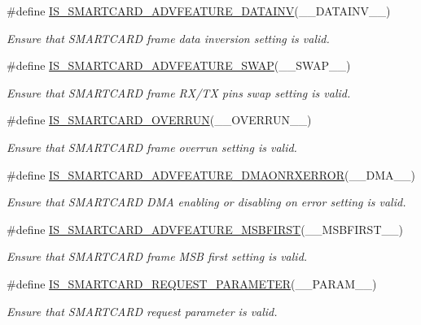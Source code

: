 \begin{DoxyCompactItemize}
\#define \hyperlink{group___s_m_a_r_t_c_a_r_d___private___macros_gaeb50799eed0020c43efd54da9ee6b5f2}{I\+S\+\_\+\+S\+M\+A\+R\+T\+C\+A\+R\+D\+\_\+\+A\+D\+V\+F\+E\+A\+T\+U\+R\+E\+\_\+\+D\+A\+T\+A\+I\+NV}(\+\_\+\+\_\+\+D\+A\+T\+A\+I\+N\+V\+\_\+\+\_\+)
\begin{DoxyCompactList}\small\item\em Ensure that S\+M\+A\+R\+T\+C\+A\+RD frame data inversion setting is valid. \end{DoxyCompactList}\item 
\#define \hyperlink{group___s_m_a_r_t_c_a_r_d___private___macros_gaafa60ea938020acb9b18923735759198}{I\+S\+\_\+\+S\+M\+A\+R\+T\+C\+A\+R\+D\+\_\+\+A\+D\+V\+F\+E\+A\+T\+U\+R\+E\+\_\+\+S\+W\+AP}(\+\_\+\+\_\+\+S\+W\+A\+P\+\_\+\+\_\+)
\begin{DoxyCompactList}\small\item\em Ensure that S\+M\+A\+R\+T\+C\+A\+RD frame R\+X/\+TX pins swap setting is valid. \end{DoxyCompactList}\item 
\#define \hyperlink{group___s_m_a_r_t_c_a_r_d___private___macros_ga62c2384d53181d9049ee70903a5bd597}{I\+S\+\_\+\+S\+M\+A\+R\+T\+C\+A\+R\+D\+\_\+\+O\+V\+E\+R\+R\+UN}(\+\_\+\+\_\+\+O\+V\+E\+R\+R\+U\+N\+\_\+\+\_\+)
\begin{DoxyCompactList}\small\item\em Ensure that S\+M\+A\+R\+T\+C\+A\+RD frame overrun setting is valid. \end{DoxyCompactList}\item 
\#define \hyperlink{group___s_m_a_r_t_c_a_r_d___private___macros_ga68caa23cdb6592178ed44b60ca5e6493}{I\+S\+\_\+\+S\+M\+A\+R\+T\+C\+A\+R\+D\+\_\+\+A\+D\+V\+F\+E\+A\+T\+U\+R\+E\+\_\+\+D\+M\+A\+O\+N\+R\+X\+E\+R\+R\+OR}(\+\_\+\+\_\+\+D\+M\+A\+\_\+\+\_\+)
\begin{DoxyCompactList}\small\item\em Ensure that S\+M\+A\+R\+T\+C\+A\+RD D\+MA enabling or disabling on error setting is valid. \end{DoxyCompactList}\item 
\#define \hyperlink{group___s_m_a_r_t_c_a_r_d___private___macros_ga96b4e4e1136da35dd0c98a98767ede7c}{I\+S\+\_\+\+S\+M\+A\+R\+T\+C\+A\+R\+D\+\_\+\+A\+D\+V\+F\+E\+A\+T\+U\+R\+E\+\_\+\+M\+S\+B\+F\+I\+R\+ST}(\+\_\+\+\_\+\+M\+S\+B\+F\+I\+R\+S\+T\+\_\+\+\_\+)
\begin{DoxyCompactList}\small\item\em Ensure that S\+M\+A\+R\+T\+C\+A\+RD frame M\+SB first setting is valid. \end{DoxyCompactList}\item 
\#define \hyperlink{group___s_m_a_r_t_c_a_r_d___private___macros_ga12cdbfdd69fa9fcb48175ed2196b27e0}{I\+S\+\_\+\+S\+M\+A\+R\+T\+C\+A\+R\+D\+\_\+\+R\+E\+Q\+U\+E\+S\+T\+\_\+\+P\+A\+R\+A\+M\+E\+T\+ER}(\+\_\+\+\_\+\+P\+A\+R\+A\+M\+\_\+\+\_\+)
\begin{DoxyCompactList}\small\item\em Ensure that S\+M\+A\+R\+T\+C\+A\+RD request parameter is valid. \end{DoxyCompactList}\end{DoxyCompactItemize}


